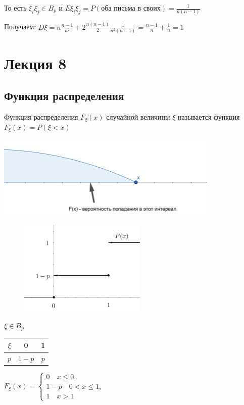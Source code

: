 \documentclass[12pt]{article}
\begin{document}
    То есть $\xi_i\xi_j \in B_p$ и $E\xi_i \xi_j = P(\text{оба письма в своих}) = \frac{1}{n(n - 1)}$

    Получаем: $D\xi = n \frac{n - 1}{n^2} + 2\frac{n(n - 1)}{2}\frac{1}{n^2(n - 1)} = \frac{n - 1}{n} + \frac{1}{n} = 1$

    



    


    \section{Лекция 8}

    \subsection{Функция распределения}

    \Def Функция распределения $F_\xi(x)$ случайной величины $\xi$ называется функция $F_\xi(x) = P(\xi < x)$

    \includegraphics[height=4cm]{probtheory/images/probtheory_2024_10_22_2}

    \begin{minipage}{\textwidth}
        \begin{figure}
            \includegraphics[height=4.5cm]{probtheory/images/probtheory_2024_10_22_3}
        \end{figure}

        \Ex $\xi \in B_p$ \qquad \begin{tabular}{c|c|c}
            $\xi$ & 0 & 1 \\ \hline
            $p$ & $1 - p$ & $p$ \\
        \end{tabular}
        
        $F_\xi(x) = \begin{cases}0 \quad x \leq 0, \\ 1 - p \quad 0 < x \leq 1, \\ 1 \quad x > 1\end{cases}$

    \end{minipage}
\end{document}
